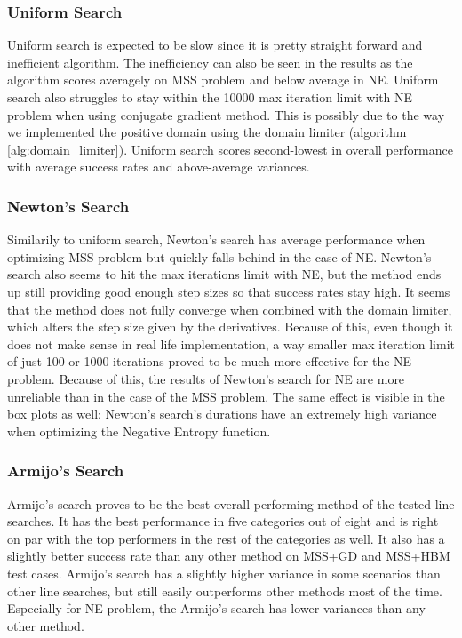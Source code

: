 \documentclass[a4paper,english,titlepage,12pt]{article}
\begin{document}
\subsubsection*{Uniform Search}

Uniform search is expected to be slow since it is pretty straight forward and inefficient algorithm. The inefficiency can also be seen in the results as the algorithm scores averagely on MSS problem and below average in NE. Uniform search also struggles to stay within the 10000 max iteration limit with NE problem when using conjugate gradient method. This is possibly due to the way we implemented the positive domain using the domain limiter (algorithm \ref{alg:domain_limiter}). Uniform search scores second-lowest in overall performance with average success rates and above-average variances.

\subsubsection*{Newton's Search}

Similarily to uniform search, Newton's search has average performance when optimizing MSS problem but quickly falls behind in the case of NE. Newton's search also seems to hit the max iterations limit with NE, but the method ends up still providing good enough step sizes so that success rates stay high. It seems that the method does not fully converge when combined with the domain limiter, which alters the step size given by the derivatives. Because of this, even though it does not make sense in real life implementation, a way smaller max iteration limit of just 100 or 1000 iterations proved to be much more effective for the NE problem. Because of this, the results of Newton's search for NE are more unreliable than in the case of the MSS problem. The same effect is visible in the box plots as well: Newton's search's durations have an extremely high variance when optimizing the Negative Entropy function.

\subsubsection*{Armijo's Search}

Armijo's search proves to be the best overall performing method of the tested line searches. It has the best performance in five categories out of eight and is right on par with the top performers in the rest of the categories as well. It also has a slightly better success rate than any other method on MSS+GD and MSS+HBM test cases. Armijo's search has a slightly higher variance in some scenarios than other line searches, but still easily outperforms other methods most of the time. Especially for NE problem, the Armijo's search has lower variances than any other method.
\end{document}

